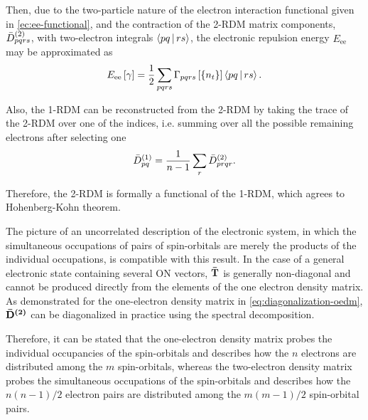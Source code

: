\begin{comentario}
Then, due to the two-particle nature of the electron interaction functional
given in \cref{ec:ee-functional}, and the contraction of the 2-RDM matrix components,
$\bar{D}^{\left( 2 \right)}_{pqrs}$, with two-electron integrals $\Braket{pq | rs}$, the
electronic repulsion energy $E_{\text{ee}}$ may be approximated as
\begin{equation} \label{eq:Eee_from_Gamma}
    E_{\text{ee}} \left[ \fordm \right]
    =
    \frac{1}{2} \sum_{pqrs}
    \sordm_{pqrs}\left[ \left\{ n_t \right\} \right] 
    \Braket{pq | rs}
    .
\end{equation}
\end{comentario}

Also, the 1-RDM can be reconstructed from the 2-RDM by taking the trace of the
2-RDM over one of the indices, i.e. summing over all the possible remaining
electrons after selecting one 
\begin{equation} \label{eq:1rdm-from-2rdm}
    \bar{D}^{\left( 1 \right)}_{pq} =
    \frac{1}{n-1} \sum_{r} \bar{D}^{\left( 2 \right)}_{prqr}
    .
\end{equation}

Therefore, the 2-RDM is formally a functional of the 1-RDM, which agrees to
Hohenberg-Kohn theorem. %


The picture of an uncorrelated description of the electronic system, in which 
the simultaneous occupations of pairs of spin-orbitals are merely the products 
of the individual occupations, is compatible with this result.
In the case of a general electronic state containing several ON vectors, $\boldsymbol{\mathrm{\bar{T}}}$
is generally non-diagonal and cannot be produced directly from the elements of 
the one electron density matrix. As demonstrated for the one-electron density 
matrix in \cref{eq:diagonalization-oedm}, $ \boldsymbol{\mathrm{\bar{D}^{\left( 2 \right)}}}$ can be diagonalized
in practice using the spectral decomposition.

Therefore, it can be stated that the one-electron density matrix probes the
individual occupancies of the spin-orbitals and describes how the $n$ electrons
are distributed among the $m$ spin-orbitals, whereas the two-electron density
matrix probes the simultaneous occupations of the spin-orbitals and describes
how the $n\left( n-1 \right) /2$ electron pairs are distributed among the 
$m\left( m-1 \right) /2$ spin-orbital pairs.

